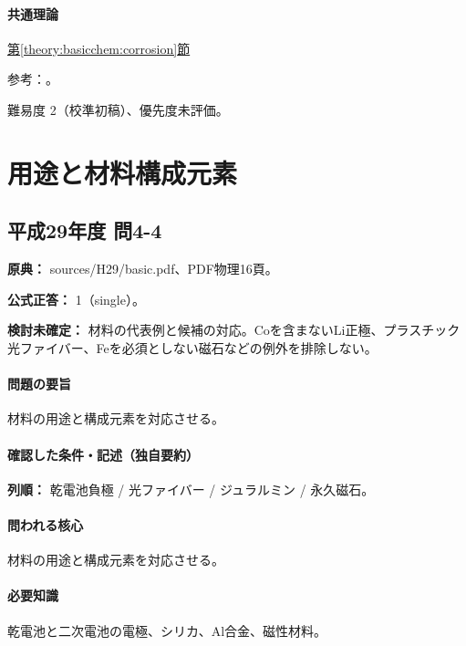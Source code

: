 \paragraph{共通理論} \hyperref[theory:basicchem:corrosion]{第\ref*{theory:basicchem:corrosion}節}

\par 参考：\cite{stainless_definition2022,chem55_corrosion}。

\par 難易度 2（校準初稿）、優先度未評価。

\section{用途と材料構成元素}

\subsection{平成29年度 問4-4}
\label{q:h29-reg-basic-4-4}

\noindent\textbf{原典：} sources/H29/basic.pdf、PDF物理16頁。

\textbf{公式正答：} 1（single）。

\par\textbf{検討未確定：} 材料の代表例と候補の対応。Coを含まないLi正極、プラスチック光ファイバー、Feを必須としない磁石などの例外を排除しない。

\paragraph{問題の要旨} 材料の用途と構成元素を対応させる。

\paragraph{確認した条件・記述（独自要約）}\mbox{}\par

\noindent\textbf{列順：} 乾電池負極 / 光ファイバー / ジュラルミン / 永久磁石。\par

\paragraph{問われる核心} 材料の用途と構成元素を対応させる。

\paragraph{必要知識} 乾電池と二次電池の電極、シリカ、Al合金、磁性材料。

